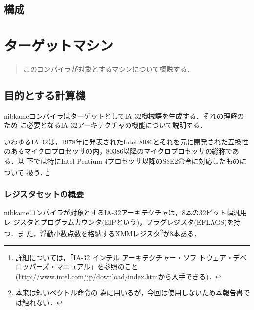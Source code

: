 \documentclass[a4paper,titlepage,disablejfam]{jsbook}
\begin{document}
\section{構成} %

\chapter{ターゲットマシン}\label{ch:target}
\begin{abstract}
このコンパイラが対象とするマシンについて概説する．
\end{abstract}

\section{目的とする計算機}\label{sc:target-machine}
nibkameコンパイラはターゲットとしてIA-32機械語を生成する．それの理解のため
に必要となるIA-32アーキテクチャの機能について説明する．

いわゆるIA-32は，1978年に発表されたIntel 8086とそれを元に開発された互換性
のあるマイクロプロセッサの内，80386以降のマイクロプロセッサの総称である．以
下では特にIntel Pentium 4プロセッサ以降のSSE2命令に対応したものについて
扱う．\footnote{詳細については，「IA-32 インテル アーキテクチャー・ソフ
トウェア・デベロッパーズ・マニュアル」を参照のこと
(\url{http://www.intel.com/jp/download/index.htm}から入手できる)．}


\subsection{レジスタセットの概要}\label{ssc:register_set}
nibkameコンパイラが対象とするIA-32アーキテクチャは，8本の32ビット幅汎用レ
ジスタとプログラムカウンタ(EIPという)，フラグレジスタ(EFLAGS)を持つ．ま
た，浮動小数点数を格納するXMMレジスタ\footnote{本来は短いベクトル命令の
為に用いるが，今回は使用しないため本報告書では触れない．}が8本ある．
\end{document}
